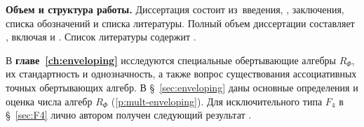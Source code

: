 %
\begin{refsection}[bl-author]
    \nocite{vmj2015}
    \nocite{jsfu2018}
    \nocite{imm2020}
    \nocite{smj2023}
    \nocite{jsfu2026}
\end{refsection}%
%

\textbf{Объем и структура работы.} Диссертация состоит из~введения,
, заключения, списка обозначений и списка литературы.
Полный объем диссертации составляет ,
включая  и
. Список литературы содержит
.

\ifsynopsis\else

    В \textbf{главе~\ref{ch:enveloping}} исследуются специальные обертывающие
    алгебры $R_{\Phi}$, их стандартность и однозначность, а также вопрос
    существования ассоциативных точных обертывающих алгебр. В
    \S~\ref{sec:enveloping} даны основные определения и оценка числа алгебр
    $R_{\Phi}$ (\cref{p:mult-enveloping}). Для исключительного типа $F_4$ в
    \S~\ref{sec:F4} лично автором получен следующий результат
    \cite[теорема~1.1]{jsfu2018}.

